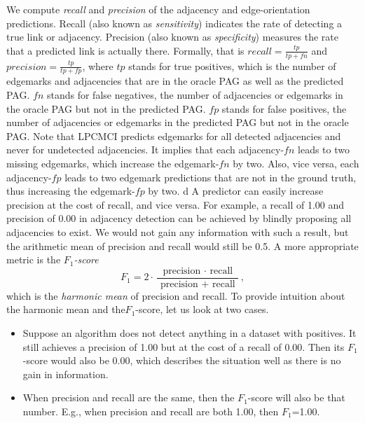 \documentclass[conference]{IEEEtran}
\begin{document}
We compute \textit{recall} and \textit{precision} of the adjacency and edge-orientation predictions. Recall (also known as \textit{sensitivity}) indicates the rate of detecting a true link or adjacency. Precision (also known as \textit{specificity}) measures the rate that a predicted link is actually there. Formally, that is $recall = \frac{tp}{tp+fn}$ and $precision = \frac{tp}{tp+fp}$, where
$tp$ stands for true positives, which is the number of edgemarks and adjacencies that are in the oracle PAG as well as the predicted PAG.
$fn$ stands for false negatives,  the number of adjacencies or edgemarks in the oracle PAG but not in the predicted PAG.
$fp$ stands for false positives, the number of adjacencies or edgemarks in the predicted PAG but not in the oracle PAG.
Note that LPCMCI predicts edgemarks for all detected adjacencies and never for undetected adjacencies. It implies that each adjacency-$fn$ leads to two missing edgemarks, which increase the edgemark-$fn$ by two.
Also, vice versa, each adjacency-$fp$ leads to two edgemark predictions that are not in the ground truth, thus increasing the edgemark-$fp$ by two.
d
A predictor can easily increase precision at the cost of recall, and vice versa. For example, a recall of 1.00 and precision of 0.00 in adjacency detection can be achieved by blindly proposing all adjacencies to exist. We would not gain any information with such a result, but the arithmetic mean of precision and recall would still be 0.5. A more appropriate metric is the \textit{$F_1$-score}
\begin{equation}
F_{1}=2 \cdot \frac{\text { precision } \cdot \text { recall }}{\text { precision }+\text { recall }},
\end{equation}
which is the \textit{harmonic mean} of precision and recall.
To provide intuition about the harmonic mean and the$F_1$-score, let us look at two cases.
\begin{itemize}
    \item Suppose an algorithm does not detect anything in a dataset with positives. It still achieves a precision of 1.00 but at the cost of a recall of 0.00. Then its $F_1$-score would also be 0.00, which describes the situation well as there is no gain in information.
    \item When precision and recall are the same, then the $F_1$-score will also be that number. E.g., when precision and recall are both 1.00, then $F_1$=1.00.
\end{itemize}
\end{document}
